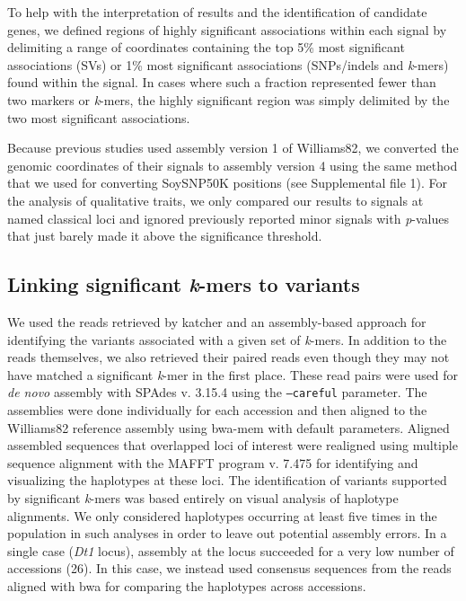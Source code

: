 \documentclass{article}
\begin{document}
To help with the interpretation of results and the identification of candidate
genes, we defined regions of highly significant associations within each signal
by delimiting a range of coordinates containing the top 5\% most significant
associations (SVs) or 1\% most significant associations (SNPs/indels
and \emph{k}-mers) found within the signal. In cases where such a fraction
represented fewer than two markers or \emph{k}-mers, the highly significant
region was simply delimited by the two most significant associations.

Because previous studies  used assembly version 1 of
Williams82, we converted the genomic coordinates of their signals to assembly version 4
using the same method that we used for converting
SoySNP50K positions (see Supplemental file 1). For the analysis of
qualitative traits, we only compared our results to signals at named classical
loci and ignored previously reported minor signals with \emph{p}-values that
just barely made it above the significance threshold.

\subsection*{Linking significant \emph{k}-mers to variants}

We used the reads retrieved by katcher and an assembly-based approach for
identifying the variants associated with a given set of \emph{k}-mers. In
addition to the reads themselves, we also retrieved their paired reads even
though they may not have matched a significant \emph{k}-mer in the first place.
These read pairs were used for \emph{de novo} assembly with SPAdes v. 3.15.4
 using the \texttt{--careful} parameter. The assemblies were done
individually for each accession and then aligned to the Williams82 reference
assembly using bwa-mem with default parameters.  Aligned assembled sequences
that overlapped loci of interest were realigned using multiple sequence
alignment with the MAFFT program v. 7.475  for identifying and
visualizing the haplotypes at these loci. The identification of variants
supported by significant \textit{k}-mers was based entirely on visual analysis
of haplotype alignments. We only considered haplotypes occurring at least five
times in the population in such analyses in order to leave out potential
assembly errors. In a single case (\emph{Dt1} locus), assembly at the locus
succeeded for a very low number of accessions (26). In this case, we instead used
consensus sequences from the reads aligned with bwa for comparing the
haplotypes across accessions. 
\end{document}
